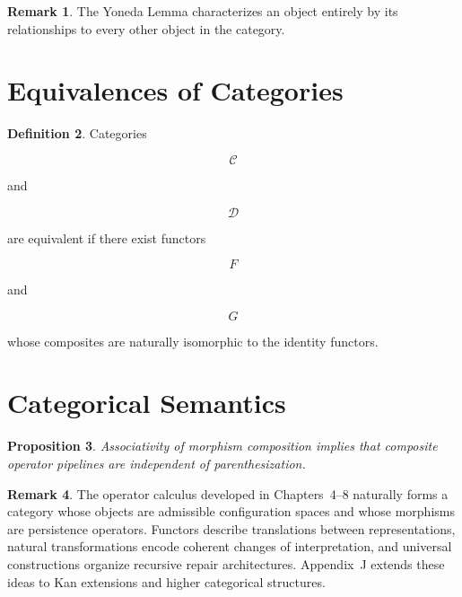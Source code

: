 \documentclass[11pt]{book}
\numberwithin{equation}{chapter}
\theoremstyle{definition}
\newtheorem{definition}{Definition}[chapter]
\newtheorem{remark}[definition]{Remark}
\theoremstyle{plain}
\newtheorem{proposition}[definition]{Proposition}
\begin{document}

\begin{remark}

The Yoneda Lemma characterizes an object entirely by its relationships
to every other object in the category.

\end{remark}


\section{Equivalences of Categories}

\begin{definition}

Categories

\[
\mathcal C
\]

and

\[
\mathcal D
\]

are equivalent if there exist functors

\[
F
\]

and

\[
G
\]

whose composites are naturally isomorphic to the identity functors.

\end{definition}


\section{Categorical Semantics}

\begin{proposition}

Associativity of morphism composition implies that composite operator
pipelines are independent of parenthesization.

\end{proposition}


\begin{remark}

The operator calculus developed in Chapters~4--8 naturally forms a
category whose objects are admissible configuration spaces and whose
morphisms are persistence operators. Functors describe translations
between representations, natural transformations encode coherent changes
of interpretation, and universal constructions organize recursive repair
architectures. Appendix~J extends these ideas to Kan extensions and
higher categorical structures.

\end{remark}
\end{document}
